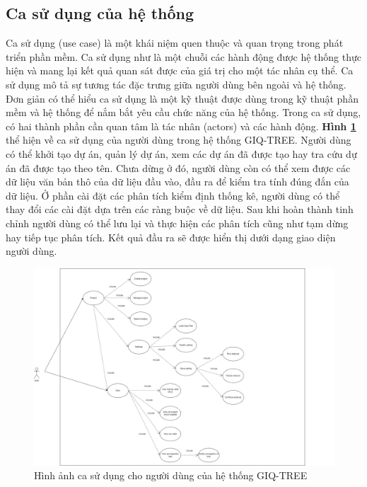 \documentclass[12pt]{report}
\begin{document}
\subsection{Ca sử dụng của hệ thống}
Ca sử dụng (use case) là một khái niệm quen thuộc và quan trọng trong phát triển phần mềm. Ca sử dụng như là một chuỗi các hành động được hệ thống thực hiện và mang lại kết quả quan sát được của giá trị cho một tác nhân cụ thể. Ca sử dụng mô tả sự tương tác đặc trưng giữa người dùng bên ngoài và hệ thống. Đơn giản có thể hiểu ca sử dụng là một kỹ thuật được dùng trong kỹ thuật phần mềm và hệ thống để nắm bắt yêu cầu chức năng của hệ thống. Trong ca sử dụng, có hai thành phần cần quan tâm là tác nhân (actors) và các hành động. \textbf{Hình \ref{fig:image4.1}} thể hiện về ca sử dụng của người dùng trong hệ thống GIQ-TREE. Người dùng có thể khởi tạo dự án, quản lý dự án, xem các dự án đã được tạo hay tra cứu dự án đã được tạo theo tên. Chưa dừng ở đó, người dùng còn có thể xem được các dữ liệu văn bản thô của dữ liệu đầu vào, đầu ra để kiểm tra tính đúng đắn của dữ liệu. Ở phần cài đặt các phân tích kiểm định thống kê, người dùng có thể thay đổi các cài đặt dựa trên các ràng buộc về dữ liệu. Sau khi hoàn thành tinh chỉnh người dùng có thể lưu lại và thực hiện các phân tích cũng như tạm dừng hay tiếp tục phân tích. Kết quả đầu ra sẽ được hiển thị dưới dạng giao diện người dùng.

\begin{figure}[h]
	\centering
	\includegraphics[scale=0.3]{Image/4.1.png}
	\caption{Hình ảnh ca sử dụng cho người dùng của hệ thống GIQ-TREE }
	\label{fig:image4.1}
\end{figure}
\end{document}
